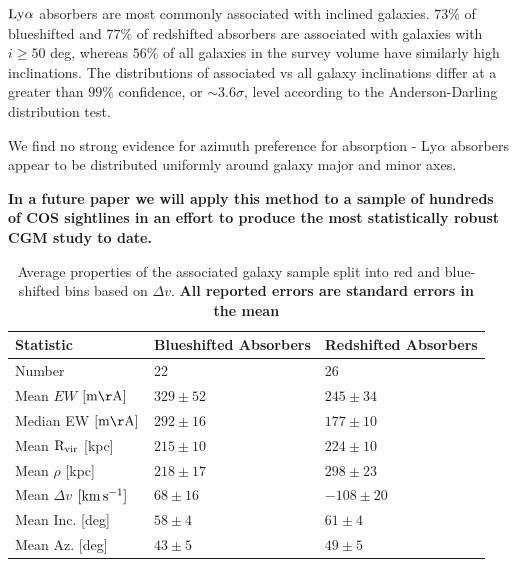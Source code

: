 \documentclass[twocolumn,tighten]{aastex6}
\begin{document}
\vspace{10pt}

\textbullet \indent $\rm Ly\alpha$ absorbers are most commonly associated with inclined galaxies. $73\%$ of blueshifted and $77\%$ of redshifted absorbers are associated with galaxies with $i \geq 50$ deg, whereas $56\%$ of all galaxies in the survey volume have similarly high inclinations. The distributions of associated vs all galaxy inclinations differ at a greater than $99\%$ confidence, or $\sim 3.6\sigma$, level according to the Anderson-Darling distribution test.

\vspace{10pt}

\indent \textbullet \indent We find no strong evidence for azimuth preference for absorption - Ly$\alpha$ absorbers appear to be distributed uniformly around galaxy major and minor axes.

\vspace{10pt}

\textbf{In a future paper we will apply this method to a sample of hundreds of COS sightlines in an effort to produce the most statistically robust CGM study to date.}


\begin{table}[ht]\footnotesize
\begin{center}
\begin{tabular}{l l l}
 \hline \hline
 Statistic                				&  Blueshifted Absorbers   &     Redshifted Absorbers     \\ 
  \hline \hline
 Number 	          			 		&     	22				&	26			\\
 Mean $EW$    \scriptsize $\rm [m\AA]$    &	$329 \pm 52$ 		&	$245 \pm 34$  	\\
 Median EW     \scriptsize $\rm [m\AA]$    & 	$292 \pm 16$		& 	$177 \pm 10$	\\
 Mean $\rm R_{vir}$   \scriptsize [kpc]	&   	$215 \pm 10$		& 	$224 \pm 10$	\\
 Mean $\rho$   \scriptsize [kpc]          		&   	$218 \pm 17$ 		& 	$298 \pm 23$	\\
 Mean $\Delta v$  \scriptsize $\rm [km\, s^{-1}]$     &	$ 68 \pm 16$    &	$-108 \pm 20$	\\
 Mean Inc.  \scriptsize [deg]  			&  	$58 \pm 4$		&	$61 \pm 4$	\\
 Mean Az.  \scriptsize [deg]    			&	$43 \pm 5$ 		&	$49 \pm 5$ 	\\
  
\hline
\end{tabular}
\end{center}
  \caption{\small{Average properties of the associated galaxy sample split into red and blue-shifted bins based on $\Delta v$. \textbf{All reported errors are standard errors in the mean}}}
  \label{resultsTable}
\end{table}
\end{document}
